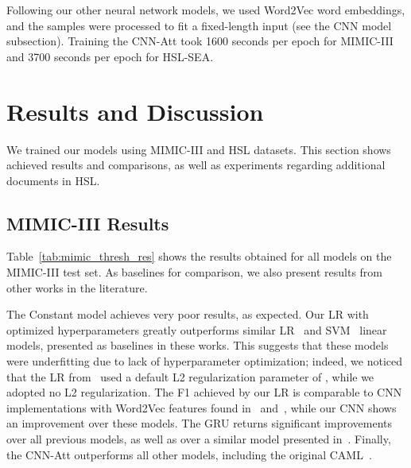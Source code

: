 \documentclass[runningheads]{llncs}
\begin{document}
Following our other neural network models, we used Word2Vec word embeddings, and the samples were processed to fit a fixed-length input (see the CNN model subsection). Training the CNN-Att took 1600 seconds per epoch for MIMIC-III and 3700 seconds per epoch for HSL-SEA.


\section{Results and Discussion}

We trained our models using MIMIC-III and HSL datasets. This section shows achieved results and comparisons, as well as experiments regarding additional documents in HSL.


\subsection{MIMIC-III Results}

Table~\ref{tab:mimic_thresh_res} shows the results obtained for all models on the MIMIC-III test set. As baselines for comparison, we also present results from other works in the literature. 

The Constant model achieves very poor results, as expected. Our LR with optimized hyperparameters greatly outperforms similar LR~\cite{mullenbachExplainablePredictionMedical2018} and SVM~\cite{liAutomatedICD9Coding2019a} linear models, presented as baselines in these works. This suggests that these models were underfitting due to lack of hyperparameter optimization; indeed, we noticed that the LR from~\cite{mullenbachExplainablePredictionMedical2018} used a default L2 regularization parameter of , while we adopted no L2 regularization. The F1 achieved by our LR is comparable to CNN implementations with Word2Vec features found in~\cite{liAutomatedICD9Coding2019a} and~\cite{mullenbachExplainablePredictionMedical2018}, while our CNN shows an improvement over these models. The GRU returns significant improvements over all previous models, as well as over a similar model presented in~\cite{mullenbachExplainablePredictionMedical2018}. Finally, the CNN-Att outperforms all other models, including the original CAML~\cite{mullenbachExplainablePredictionMedical2018}.
\end{document}

